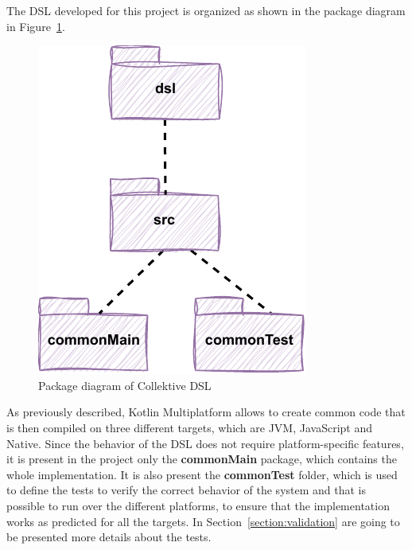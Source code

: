 The DSL developed for this project is organized as shown in the package diagram in Figure~\ref{fig:dsl_packege_diagram}.\newline
\begin{figure}[!ht]
    \centering
    \includegraphics[scale=1]{document/chapters/4-collektive/images/dsl_package_diagram.pdf}
    \caption{Package diagram of Collektive DSL}
    \label{fig:dsl_packege_diagram}
\end{figure}
As previously described, Kotlin Multiplatform allows to create common code that is then compiled on three different targets, which are JVM, JavaScript and Native. Since the behavior of the DSL does not require platform-specific features, it is present in the project only the \textbf{commonMain} package, which contains the whole implementation.\newline
It is also present the \textbf{commonTest} folder, which is used to define the tests to verify the correct behavior of the system and that is possible to run over the different platforms, to ensure that the implementation works as predicted for all the targets. In Section~\ref{section:validation} are going to be presented more details about the tests.

